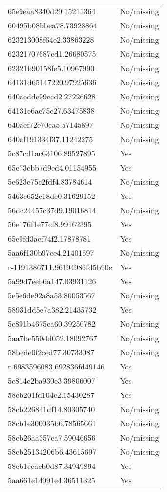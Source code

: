 \begin{tabular}{ll}
65e9eaa8340d29.15211364 & No/missing \\
60495b08bbea78.73928864 & No/missing \\
623213008f64e2.33863228 & No/missing \\
62321707687ed1.26680575 & No/missing \\
62321b90158fe5.10967990 & No/missing \\
64131d65147220.97925636 & No/missing \\
640aedde99ecd2.27226628 & No/missing \\
64131e6ae75c27.63475838 & No/missing \\
640aef72e70ca5.57145897 & No/missing \\
640af191334f37.11242275 & No/missing \\
5c87cd1ac63106.89527895 & Yes \\
65e73cbb7d9ed4.01154955 & Yes \\
5e623e75c2fdf4.83784614 & No/missing \\
5463c652c18de0.31629152 & Yes \\
56dc24457c37d9.19016814 & No/missing \\
56e176f1e77cf8.99162395 & Yes \\
65e9fd3aef74f2.17878781 & Yes \\
5aa6f130b97ce4.21401697 & No/missing \\
r-1191386711.96194986fd5b90e & Yes \\
5a99d7eeb6a147.03931126 & Yes \\
5e5e6de92a8a53.80053567 & No/missing \\
58931dd5e7a382.21435732 & Yes \\
5c891b4675ca60.39250782 & No/missing \\
5aa7be550dd052.18092767 & No/missing \\
58bede0f2ced77.30733087 & No/missing \\
r-6983596083.692836fd49146 & Yes \\
5c814c2ba930e3.39806007 & Yes \\
58cb201fd104c2.15430287 & Yes \\
58cb226841df14.80305740 & No/missing \\
58cb1e300035b6.78565661 & No/missing \\
58cb26aa357ea7.59046656 & No/missing \\
58cb25134206b6.43615697 & No/missing \\
58cb1eeacb0d87.34949894 & Yes \\
5aa661e14991e4.36511325 & Yes \\

\end{tabular}
